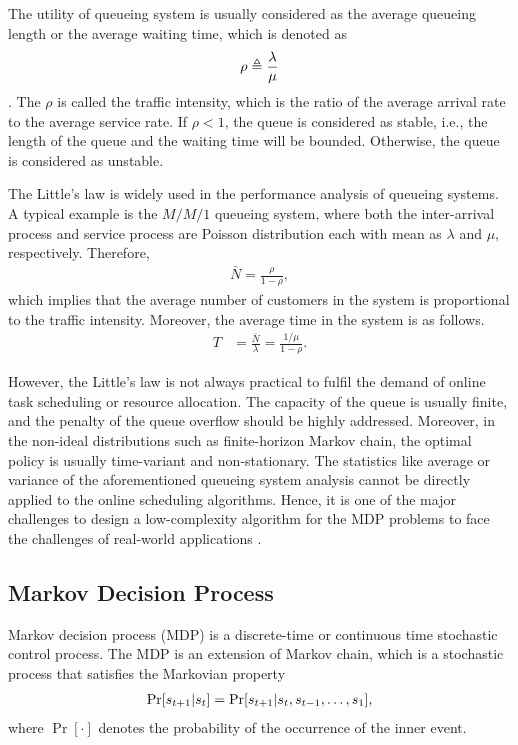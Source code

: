 The utility of queueing system is usually considered as the average queueing length or the average waiting time, which is denoted as
$$
\rho \triangleq \frac{ \lambda }{ \mu }
$$.
The $\rho$ is called the traffic intensity, which is the ratio of the average arrival rate to the average service rate.
If $\rho < 1$, the queue is considered as stable, i.e., the length of the queue and the waiting time will be bounded.
Otherwise, the queue is considered as unstable.

The Little's law is widely used in the performance analysis of queueing systems.
A typical example is the $M/M/1$ queueing system, where both the inter-arrival process and service process are Poisson distribution each with mean as $\lambda$ and $\mu$, respectively.
Therefore,
\begin{align*}
    \bar{N} = \frac{ \rho }{  1- \rho },
\end{align*}
which implies that the average number of customers in the system is proportional to the traffic intensity.
Moreover, the average time in the system is as follows.
\begin{align*}
    T &= \frac{ \bar{N} }{ \lambda } = \frac{ 1/\mu }{ 1- \rho }.
\end{align*}

However, the Little's law is not always practical to fulfil the demand of online task scheduling or resource allocation.
The capacity of the queue is usually finite, and the penalty of the queue overflow should be highly addressed.
Moreover, in the non-ideal distributions such as finite-horizon Markov chain, the optimal policy is usually time-variant and non-stationary.
The statistics like average or variance of the aforementioned queueing system analysis cannot be directly applied to the online scheduling algorithms.
Hence, it is one of the major challenges to design a low-complexity algorithm for the MDP problems to face the challenges of real-world applications \cite{MEC-SURVEY,tan-online,jieXu2018}.

\subsection{Markov Decision Process}
Markov decision process (MDP) is a discrete-time or continuous time stochastic control process.
The MDP is an extension of Markov chain, which is a stochastic process that satisfies the Markovian property
\begin{align*}
    \Pr[ s_{t+1} | s_{t} ] = \Pr[ s_{t+1} | s_{t}, s_{t-1}, \dots, s_{1} ],
\end{align*}
where $\Pr[\cdot]$ denotes the probability of the occurrence of the inner event.

